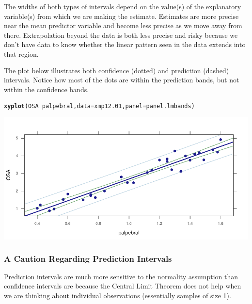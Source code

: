 \documentclass[twoside]{book}\usepackage[]{graphicx}\usepackage[]{xcolor}
\makeatletter
\newcommand{\hlopt}[1]{\textcolor[rgb]{0,0,0}{#1}}%
\newcommand{\hlstd}[1]{\textcolor[rgb]{0.345,0.345,0.345}{#1}}%
\newcommand{\hlkwc}[1]{\textcolor[rgb]{0.333,0.667,0.333}{#1}}%
\newcommand{\hlkwd}[1]{\textcolor[rgb]{0.737,0.353,0.396}{\textbf{#1}}}%
\newenvironment{kframe}{%
 \def\at@end@of@kframe{}%
 \ifinner\ifhmode%
  \def\at@end@of@kframe{\end{minipage}}%
  \begin{minipage}{\columnwidth}%
 \fi\fi%
 \def\FrameCommand##1{\hskip\@totalleftmargin \hskip-\fboxsep
 \colorbox{shadecolor}{##1}\hskip-\fboxsep
     \hskip-\linewidth \hskip-\@totalleftmargin \hskip\columnwidth}%
 \MakeFramed {\advance\hsize-\width
   \@totalleftmargin\z@ \linewidth\hsize
   \@setminipage}}%
 {\par\unskip\endMakeFramed%
 \at@end@of@kframe}
\newenvironment{knitrout}{}{} %
\makeatother
\begin{document}
The widths of both types of intervals depend on the value(s) of the explanatory
variable(s) from which we are making the estimate.  Estimates are more
precise near the mean predictor variable and become less precise as we move
away from there.  Extrapolation beyond the data is both less precise and risky
because we don't have data to know whether the linear pattern seen in the data
extends into that region.

The plot below illustrates both confidence (dotted) and prediction (dashed) 
intervals.
Notice how most of the dots are within the prediction bands, but not within the 
confidence bands.
\begin{knitrout}
\color{fgcolor}\begin{kframe}
\begin{alltt}
\hlkwd{xyplot}\hlstd{(OSA} \hlopt{~} \hlstd{palpebral,} \hlkwc{data} \hlstd{= xmp12.01,} \hlkwc{panel} \hlstd{= panel.lmbands)}
\end{alltt}
\end{kframe}

{\centering \includegraphics[width=.9\textwidth]{figures/fig-unnamed-chunk-197-1} 

}



\end{knitrout}

\subsubsection{A Caution Regarding Prediction Intervals}
Prediction intervals are much more sensitive to the normality assumption
than confidence intervals are because the Central Limit Theorem does not 
help when we are thinking about individual observations (essentially samples of 
size 1).
\end{document}
